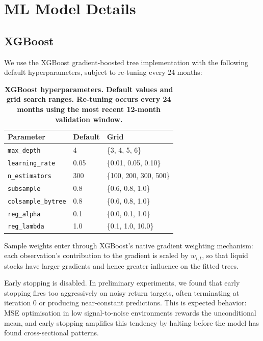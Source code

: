 \appendix

\clearpage

\section{ML Model Details}
\label{app:ml_details}

\subsection{XGBoost}
\label{app:xgboost}

We use the XGBoost gradient-boosted tree implementation with the following default hyperparameters, subject to re-tuning every 24 months:

\begin{table}[h!]
\centering
\begin{tabular}{l l l}
\midrule
Parameter & Default & Grid \\
\midrule
\texttt{max\_depth} & 4 & \{3, 4, 5, 6\} \\
\texttt{learning\_rate} & 0.05 & \{0.01, 0.05, 0.10\} \\
\texttt{n\_estimators} & 300 & \{100, 200, 300, 500\} \\
\texttt{subsample} & 0.8 & \{0.6, 0.8, 1.0\} \\
\texttt{colsample\_bytree} & 0.8 & \{0.6, 0.8, 1.0\} \\
\texttt{reg\_alpha} & 0.1 & \{0.0, 0.1, 1.0\} \\
\texttt{reg\_lambda} & 1.0 & \{0.1, 1.0, 10.0\} \\
\midrule
\end{tabular}
\caption{\footnotesize \bf XGBoost hyperparameters\normalfont. Default values and grid search ranges. Re-tuning occurs every 24 months using the most recent 12-month validation window.}
\label{tab:xgb_params}
\end{table}

Sample weights enter through XGBoost's native gradient weighting mechanism: each observation's contribution to the gradient is scaled by $w_{i,t}$, so that liquid stocks have larger gradients and hence greater influence on the fitted trees.

Early stopping is disabled. In preliminary experiments, we found that early stopping fires too aggressively on noisy return targets, often terminating at iteration 0 or producing near-constant predictions. This is expected behavior: MSE optimisation in low signal-to-noise environments rewards the unconditional mean, and early stopping amplifies this tendency by halting before the model has found cross-sectional patterns.

